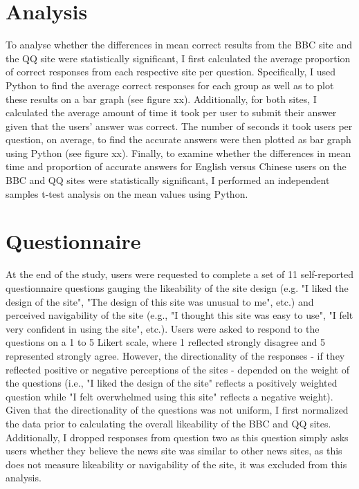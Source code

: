  
\section{Analysis }
To analyse whether the differences in mean correct results from the BBC site and the QQ site were statistically significant, I first calculated the average proportion of correct responses from each respective site per question. Specifically, I used Python to find the average correct responses for each group as well as to plot these results on a bar graph (see figure xx). Additionally, for both sites, I calculated the average amount of time it took per user to submit their answer given that the users' answer was correct. The number of seconds it took users per question, on average, to find the accurate answers were then plotted as bar graph using Python (see figure xx). Finally, to examine whether the differences in mean time and proportion of accurate answers for English versus Chinese users on the BBC and QQ sites were statistically significant, I performed an independent samples t-test analysis on the mean values using Python. 

\section{Questionnaire }
At the end of the study, users were requested to complete a set of 11 self-reported questionnaire questions gauging the likeability of the site design (e.g. "I liked the design of the site", "The design of this site was unusual to me", etc.) and perceived navigability of the site (e.g., "I thought this site was easy to use", "I felt very confident in using the site", etc.).  Users were asked to respond to the questions on a 1 to 5 Likert scale, where 1 reflected strongly disagree and 5 represented strongly agree. However, the directionality of the responses - if they reflected positive or negative perceptions of the sites - depended on the weight of the questions (i.e., "I liked the design of the site" reflects a positively weighted question while "I felt overwhelmed using this site" reflects a negative weight). Given that the directionality of the questions was not uniform, I first normalized the data prior to calculating the overall likeability of the BBC and QQ sites. Additionally, I dropped responses from question two as this question simply asks users whether they believe the news site was similar to other news sites, as this does not measure likeability or navigability of the site, it was excluded from this analysis. 
